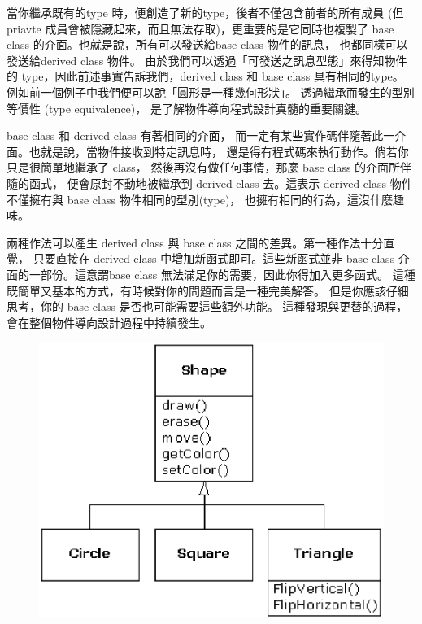 當你繼承既有的type 時，便創造了新的type，後者不僅包含前者的所有成員
(但priavte 成員會被隱藏起來，而且無法存取)，更重要的是它同時也複製了
base class 的介面。也就是說，所有可以發送給base class 物件的訊息，
也都同樣可以發送給derived class 物件。
由於我們可以透過「可發送之訊息型態」來得知物件的
type，因此前述事實告訴我們，derived class 和
base class 具有相同的type。
例如前一個例子中我們便可以說「圓形是一種幾何形狀」。
透過繼承而發生的型別等價性 (type equivalence)，
是了解物件導向程式設計真髓的重要關鍵。

base class 和 derived class 有著相同的介面，
而一定有某些實作碼伴隨著此一介面。也就是說，當物件接收到特定訊息時，
還是得有程式碼來執行動作。倘若你只是很簡單地繼承了 class，
然後再沒有做任何事情，那麼 base class 的介面所伴隨的函式，
便會原封不動地被繼承到 derived class 去。這表示 derived class 物件不僅擁有與
base class 物件相同的型別(type)， 也擁有相同的行為，這沒什麼趣味。

兩種作法可以產生 derived class 與 base class 之間的差異。第一種作法十分直覺，
只要直接在 derived class 中增加新函式即可。這些新函式並非 base class
介面的一部份。這意謂base class 無法滿足你的需要，因此你得加入更多函式。
這種既簡單又基本的方式，有時候對你的問題而言是一種完美解答。
但是你應該仔細思考，你的 base class 是否也可能需要這些額外功能。
這種發現與更替的過程，會在整個物件導向設計過程中持續發生。

\begin{figure}[htbp]
\centering
\includegraphics{eps/TIJ207.eps}
\end{figure}

